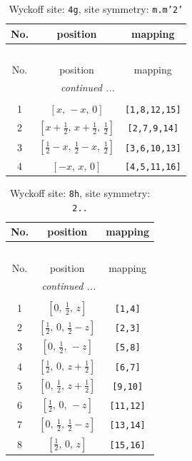 \documentclass[fleqn,8pt]{jsarticle}
\begin{document}
\renewcommand{\arraystretch}{1.2}
\begin{longtable}{ccc}
\caption{Wyckoff site: {\tt 4g}, site symmetry: {\tt m.m'2'}}
 \\
 \hline \hline
No. & position & mapping \\ \hline \endfirsthead

\multicolumn{2}{l}{\tablename\ \thetable{}} \\
 \hline \hline
No. & position & mapping \\ \hline \endhead

 \hline \hline
\multicolumn{2}{r}{\footnotesize\it continued ...} \\ \endfoot

 \hline \hline
\multicolumn{2}{r}{} \\ \endlastfoot

1 & $\left[ x,\, - x,\, 0 \right]$ & {\tt [1,8,12,15]} \\ \hline
2 & $\left[ x + \frac{1}{2},\, x + \frac{1}{2},\, \frac{1}{2} \right]$ & {\tt [2,7,9,14]} \\ \hline
3 & $\left[ \frac{1}{2} - x,\, \frac{1}{2} - x,\, \frac{1}{2} \right]$ & {\tt [3,6,10,13]} \\ \hline
4 & $\left[ - x,\, x,\, 0 \right]$ & {\tt [4,5,11,16]} \\
\end{longtable}
\renewcommand{\arraystretch}{1.2}
\begin{longtable}{ccc}
\caption{Wyckoff site: {\tt 8h}, site symmetry: {\tt 2..}}
 \\
 \hline \hline
No. & position & mapping \\ \hline \endfirsthead

\multicolumn{2}{l}{\tablename\ \thetable{}} \\
 \hline \hline
No. & position & mapping \\ \hline \endhead

 \hline \hline
\multicolumn{2}{r}{\footnotesize\it continued ...} \\ \endfoot

 \hline \hline
\multicolumn{2}{r}{} \\ \endlastfoot

1 & $\left[ 0,\, \frac{1}{2},\, z \right]$ & {\tt [1,4]} \\ \hline
2 & $\left[ \frac{1}{2},\, 0,\, \frac{1}{2} - z \right]$ & {\tt [2,3]} \\ \hline
3 & $\left[ 0,\, \frac{1}{2},\, - z \right]$ & {\tt [5,8]} \\ \hline
4 & $\left[ \frac{1}{2},\, 0,\, z + \frac{1}{2} \right]$ & {\tt [6,7]} \\ \hline
5 & $\left[ 0,\, \frac{1}{2},\, z + \frac{1}{2} \right]$ & {\tt [9,10]} \\ \hline
6 & $\left[ \frac{1}{2},\, 0,\, - z \right]$ & {\tt [11,12]} \\ \hline
7 & $\left[ 0,\, \frac{1}{2},\, \frac{1}{2} - z \right]$ & {\tt [13,14]} \\ \hline
8 & $\left[ \frac{1}{2},\, 0,\, z \right]$ & {\tt [15,16]} \\
\end{longtable}
\end{document}
